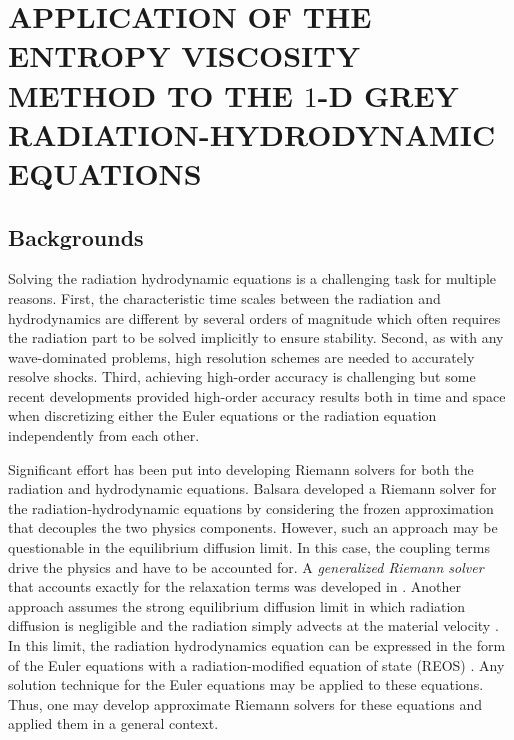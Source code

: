 %
%
%

\chapter{\uppercase {Application of the entropy viscosity method to the $1$-D grey radiation-hydrodynamic equations}}\label{chap:hydro}
\section{Backgrounds}\label{sec:back_sect5}
Solving the radiation hydrodynamic equations is a challenging task for multiple reasons. First, the characteristic time scales between the radiation and hydrodynamics are different by several orders of magnitude which often requires the radiation part to be solved implicitly to ensure stability. Second, as with any wave-dominated problems, high resolution schemes are needed to accurately resolve shocks. Third, achieving high-order accuracy is challenging but some recent developments provided high-order accuracy results both in time and space when discretizing either the Euler equations \cite{Hussaini, jlg1, jlg2, Leveque} or the radiation equation independently from each other. 

Significant effort has been put into developing Riemann solvers for both the radiation and hydrodynamic equations. Balsara \cite{Balsara} developed a Riemann solver for the radiation-hydrodynamic equations by considering the frozen approximation that decouples the two physics components. However, such an approach may be questionable in the equilibrium diffusion limit. In this case, the coupling terms drive the physics and have to be accounted for. A \emph{generalized Riemann solver} that accounts exactly for the relaxation terms was developed in \cite{Balsara}. Another approach assumes the strong equilibrium diffusion limit in which radiation diffusion is negligible and the radiation simply advects at the material velocity \cite{Woodward}. In this limit, the radiation hydrodynamics equation can be expressed in the form of the Euler equations with a radiation-modified equation of state (REOS) . Any solution technique for the Euler equations may be applied to these equations. Thus, one may develop approximate Riemann solvers for these equations and applied them in a general context. 

